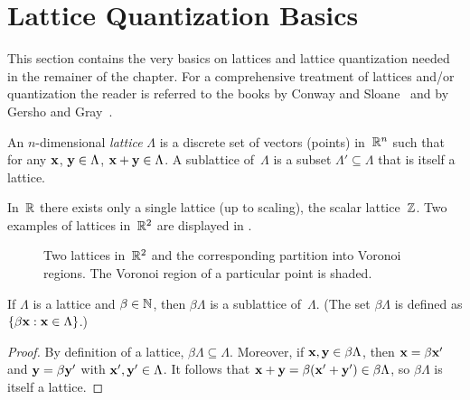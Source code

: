 \section{Lattice Quantization Basics}\label{sec:latquantbasics}

This section contains the very basics on lattices and lattice quantization
needed in the remainer of the chapter. For a comprehensive treatment of lattices
and/or quantization the reader is referred to the books by Conway and
Sloane~\cite{ConwayS1988} and by Gersho and Gray~\cite{GershoG1992}.

\begin{definition}
  An $n$-dimensional \emph{lattice} $\Lambda$ is a discrete set of vectors
  (points) in~$\mathbb{R}^n$ such that for any $\mathbf{x}$, $\mathbf{y} \in \Lambda$, $\mathbf{x} + \mathbf{y} \in
  \Lambda$. A sublattice of~$\Lambda$ is a subset $\Lambda' \subseteq \Lambda$
  that is itself a lattice. 
\end{definition}

\begin{example}
  \label{ex:scalarlattice}
  In~$\mathbb{R}$ there exists only a single lattice (up to scaling), the scalar
  lattice~$\mathbb{Z}$. Two examples of lattices in~$\mathbb{R}^2$ are displayed in
  .
\end{example}
\begin{figure}[tbp]
  \centerline{%
  \hfil
  }
  \caption{Two lattices in~$\mathbb{R}^2$ and the corresponding partition into Voronoi
  regions. The Voronoi region of a particular point is shaded.}
  \label{fig:r2lattices}
\end{figure}
\begin{proposition}
  \label{prop:intsublattice}
  If $\Lambda$ is a lattice and $\beta \in {\mathbb{N}}$, then $\beta \Lambda$ is a
  sublattice of~$\Lambda$. (The set $\beta \Lambda$ is defined as $\{ \beta \mathbf{x} :
  \mathbf{x} \in \Lambda\}$.)
\end{proposition}

\begin{proof}
  By definition of a lattice, $\beta \Lambda \subseteq \Lambda$. Moreover, if
  $\mathbf{x}, \mathbf{y} \in \beta \Lambda$, then $\mathbf{x} = \beta \mathbf{x}'$ and $\mathbf{y} = \beta \mathbf{y}'$ with
  $\mathbf{x}', \mathbf{y}' \in \Lambda$. It follows that $\mathbf{x} + \mathbf{y} = \beta (\mathbf{x}' + \mathbf{y}') \in \beta
  \Lambda$, so $\beta\Lambda$ is itself a lattice.
\end{proof}

